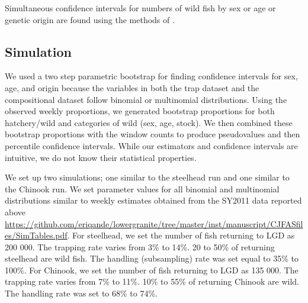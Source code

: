 \documentclass[%
                leqno,         %
%
]{nrc1}                          %
\begin{document}
Simultaneous confidence intervals for numbers of wild fish by sex or age or genetic origin are found using the methods of \citet{Mandel2008}.

\subsection*{Simulation} 

We used a two step parametric bootstrap for finding confidence intervals for sex, age, and origin because the variables in both the trap dataset and the compositional dataset follow binomial or multinomial distributions. Using the observed weekly proportions, we generated bootstrap proportions for both  hatchery/wild and categories of wild (sex, age, stock). We then combined these bootstrap proportions with the window counts to produce pseudovalues and then percentile confidence intervals. While our estimators and confidence intervals are intuitive, we do not know their statistical properties.

We set up two simulations; one similar to the steelhead run and one similar to the Chinook run. We set parameter values for all binomial and multinomial distributions similar to weekly estimates obtained from the SY2011 data reported above \url{https://github.com/eriqande/lowergranite/tree/master/inst/manuscript/CJFASfiles/SimTables.pdf}. For steelhead, we set the number of fish returning to LGD as 200 000. The trapping rate varies from 3\% to 14\%. 20 to 50\% of returning steelhead are wild fish. The handling (subsampling) rate was set equal to 35\% to 100\%. For Chinook, we set the number of fish returning to LGD as 135 000. The trapping rate varies from 7\% to 11\%. 10\% to 55\% of returning Chinook are wild. The handling rate was set to 68\% to 74\%.
\end{document}
